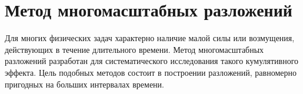 \chapter*{Метод многомасштабных разложений}

Для многих физических задач характерно
наличие малой силы или возмущения,
действующих в течение длительного времени.
Метод многомасштабных разложений разработан
для систематического исследования
такого кумулятивного эффекта.
Цель подобных методов состоит
в построении разложений,
равномерно пригодных на больших интервалах времени.
\cite{coul1972}
